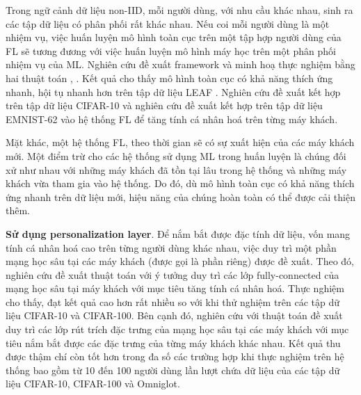 \documentclass[runningheads]{llncs}
\begin{document}
Trong ngữ cảnh dữ liệu non-IID, mỗi người dùng, với nhu cầu khác nhau, sinh ra các tập dữ liệu có phân phối rất khác nhau. Nếu coi mỗi người dùng là một nhiệm vụ, việc huấn luyện mô hình toàn cục trên một tập hợp người dùng của FL sẽ tương đương với việc huấn luyện mô hình máy học trên một phân phối nhiệm vụ của ML. Nghiên cứu \cite{chen2018federated} đề xuất framework  và minh hoạ thực nghiệm bằng hai thuật toán , . Kết quả cho thấy mô hình toàn cục có khả năng thích ứng nhanh, hội tụ nhanh hơn  trên tập dữ liệu LEAF \cite{caldas2018leaf}. Nghiên cứu \cite{fallah2020personalized} đề xuất kết hợp  trên tập dữ liệu CIFAR-10 và nghiên cứu \cite{jiang2019improving} đề xuất kết hợp  \cite{nichol2018first} trên tập dữ liệu EMNIST-62 vào hệ thống FL để tăng tính cá nhân hoá trên từng máy khách.

Mặt khác, một hệ thống FL, theo thời gian sẽ có sự xuất hiện của các máy khách mới. Một điểm trừ cho các hệ thống sử dụng ML trong huấn luyện là chúng đối xử như nhau với những máy khách đã tồn tại lâu trong hệ thống và những máy khách vừa tham gia vào hệ thống. Do đó, dù mô hình toàn cục có khả năng thích ứng nhanh trên dữ liệu mới, hiệu năng của chúng hoàn toàn có thể được cải thiện thêm.

\textbf{Sử dụng personalization layer}. Để nắm bắt được đặc tính dữ liệu, vốn mang tính cá nhân hoá cao trên từng người dùng khác nhau, việc duy trì một phần mạng học sâu tại các máy khách (được gọi là phần riêng) được đề xuất. Theo đó, nghiên cứu \cite{arivazhagan2019federated} đề xuất thuật toán  với ý tưởng duy trì các lớp fully-connected của mạng học sâu tại máy khách với mục tiêu tăng tính cá nhân hoá. Thực nghiệm cho thấy,  đạt kết quả cao hơn rất nhiều so với  khi thử nghiệm trên các tập dữ liệu CIFAR-10 và CIFAR-100. Bên cạnh đó, nghiên cứu \cite{liang2020think} với thuật toán  đề xuất duy trì các lớp rút trích đặc trưng của mạng học sâu tại các máy khách với mục tiêu nắm bắt được các đặc trưng của từng máy khách khác nhau. Kết quả thu được thậm chí còn tốt hơn  trong đa số các trường hợp khi thực nghiệm trên hệ thống bao gồm từ 10 đến 100 người dùng lần lượt chứa dữ liệu của các tập dữ liệu CIFAR-10, CIFAR-100 và Omniglot. 
\end{document}
